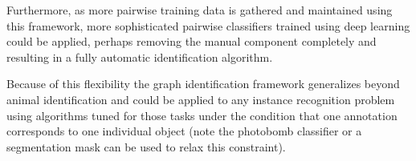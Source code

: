 
  

Furthermore, as more pairwise training data is gathered and maintained using this framework, more sophisticated
  pairwise classifiers trained using deep learning could be applied, perhaps removing the manual component
  completely and resulting in a fully automatic identification algorithm.

Because of this flexibility the graph identification framework generalizes beyond animal identification and could
  be applied to any instance recognition problem using algorithms tuned for those tasks under the condition that
one annotation corresponds to one individual object (note the photobomb classifier or a segmentation mask can be
  used to relax this
  constraint).
